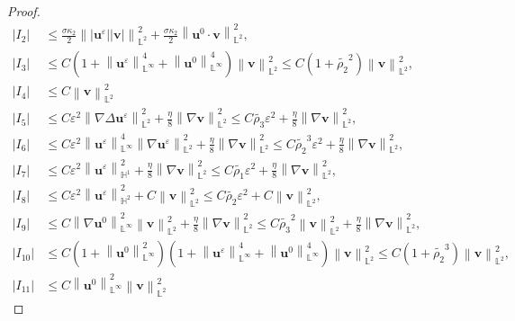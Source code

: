 \documentclass[10pt,a4paper]{amsart}
\newcommand{\abs}[1]{\left|{#1}\right|}
\newcommand{\bb}{\mathbb}
\newcommand{\bff}{\boldsymbol}
\newcommand{\norm}[2]{\left\|{#1}\right\|_{#2}}
\begin{document}
\begin{proof}
\begin{align*}
    \abs{I_2}
    &\leq
    \frac{\sigma\kappa_2}{2} \norm{|\bff{u}^\varepsilon| |\bff{v}|}{\bb{L}^2}^2
    +
    \frac{\sigma\kappa_2}{2} \norm{\bff{u}^0 \cdot \bff{v}}{\bb{L}^2}^2,
    \\
    \abs{I_3}
    &\leq
    C \left(1+\norm{\bff{u}^\varepsilon}{\bb{L}^\infty}^4 + \norm{\bff{u}^0}{\bb{L}^\infty}^4 \right) \norm{\bff{v}}{\bb{L}^2}^2
    \leq
    C(1+\widetilde{\rho_2}^2) \norm{\bff{v}}{\bb{L}^2}^2,
    \\
    \abs{I_4}
    &\leq
    C\norm{\bff{v}}{\bb{L}^2}^2
    \\
    \abs{I_5}
    &\leq
    C\varepsilon^2 \norm{\nabla\Delta \bff{u}^\varepsilon}{\bb{L}^2}^2
    +
    \frac{\eta}{8} \norm{\nabla \bff{v}}{\bb{L}^2}^2
    \leq
    C\widetilde{\rho_3} \varepsilon^2 
    +
    \frac{\eta}{8} \norm{\nabla \bff{v}}{\bb{L}^2}^2,
    \\
    \abs{I_6}
    &\leq
    C\varepsilon^2 \norm{\bff{u}^\varepsilon}{\bb{L}^\infty}^4 \norm{\nabla \bff{u}^\varepsilon}{\bb{L}^2}^2
    +
    \frac{\eta}{8} \norm{\nabla \bff{v}}{\bb{L}^2}^2
    \leq
    C\widetilde{\rho_2}^3 \varepsilon^2
    +
    \frac{\eta}{8} \norm{\nabla \bff{v}}{\bb{L}^2}^2,
    \\
    \abs{I_7}
    &\leq
    C\varepsilon^2 \norm{\bff{u}^\varepsilon}{\bb{H}^1}^2
    +
    \frac{\eta}{8} \norm{\nabla \bff{v}}{\bb{L}^2}^2
    \leq
    C \widetilde{\rho_1} \varepsilon^2 
    +
    \frac{\eta}{8} \norm{\nabla \bff{v}}{\bb{L}^2}^2,
    \\
    \abs{I_8}
    &\leq
    C\varepsilon^2 \norm{\bff{u}^\varepsilon}{\bb{H}^2}^2
    +
    C \norm{\bff{v}}{\bb{L}^2}^2
    \leq
    C\widetilde{\rho_2} \varepsilon^2
    +
    C \norm{\bff{v}}{\bb{L}^2}^2,
    \\
    \abs{I_9}
    &\leq
    C \norm{\nabla \bff{u}^0}{\bb{L}^\infty}^2 \norm{\bff{v}}{\bb{L}^2}^2
    +
    \frac{\eta}{8} \norm{\nabla\bff{v}}{\bb{L}^2}^2
    \leq
    C\widetilde{\rho_3}^2 \norm{\bff{v}}{\bb{L}^2}^2
    +
    \frac{\eta}{8} \norm{\nabla \bff{v}}{\bb{L}^2}^2,
    \\
    \abs{I_{10}}
    &\leq
    C\left(1+\norm{\bff{u}^0}{\bb{L}^\infty}^2 \right) \left(1+\norm{\bff{u}^\varepsilon}{\bb{L}^\infty}^4 +\norm{\bff{u}^0}{\bb{L}^\infty}^4 \right) \norm{\bff{v}}{\bb{L}^2}^2
    \leq
    C(1+\widetilde{\rho_2}^3) \norm{\bff{v}}{\bb{L}^2}^2,
    \\
    \abs{I_{11}}
    &\leq
    C\norm{\bff{u}^0}{\bb{L}^\infty}^2 \norm{\bff{v}}{\bb{L}^2}^2

\end{align*}
\end{proof}
\end{document}
